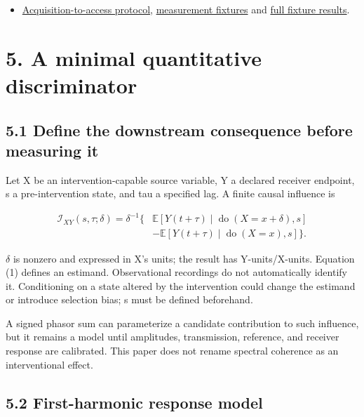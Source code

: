 \documentclass[
  american,
  11pt,
  letterpaper,
]{article}
\begin{document}
\begin{itemize}
\item
  \href{https://github.com/v5ma/v5ma.github.io/blob/master/papers/companions/learning-to-feel-v1.0/ARTIFACT-AVAILABILITY.md#artifact-1}{Acquisition-to-access protocol}, \href{https://github.com/v5ma/v5ma.github.io/blob/master/papers/companions/learning-to-feel-v1.0/analysis/acquisition-access-check.mjs}{measurement fixtures} and \href{https://github.com/v5ma/v5ma.github.io/blob/master/papers/companions/learning-to-feel-v1.0/analysis/acquisition-access-results.json}{full fixture results}.
\end{itemize}

\section{5. A minimal quantitative discriminator}\label{a-minimal-quantitative-discriminator}

\subsection{5.1 Define the downstream consequence before measuring it}\label{define-the-downstream-consequence-before-measuring-it}

Let X be an intervention-capable source variable, Y a declared receiver endpoint, s a pre-intervention state, and tau a specified lag. A finite causal influence is

\begin{equation}
\begin{aligned}\mathcal I_{XY}(s,\tau;\delta)=\delta^{-1}\bigl\{&\mathbb E[Y(t+\tau)\mid\operatorname{do}(X=x+\delta),s]\\ &-\mathbb E[Y(t+\tau)\mid\operatorname{do}(X=x),s]\bigr\}.\end{aligned}\tag{1}
\end{equation}

\(\delta\) is nonzero and expressed in X's units; the result has Y-units/X-units. Equation (1) defines an estimand. Observational recordings do not automatically identify it. Conditioning on a state altered by the intervention could change the estimand or introduce selection bias; s must be defined beforehand.

A signed phasor sum can parameterize a candidate contribution to such influence, but it remains a model until amplitudes, transmission, reference, and receiver response are calibrated. This paper does not rename spectral coherence as an interventional effect.

\subsection{5.2 First-harmonic response model}\label{first-harmonic-response-model}
\end{document}
